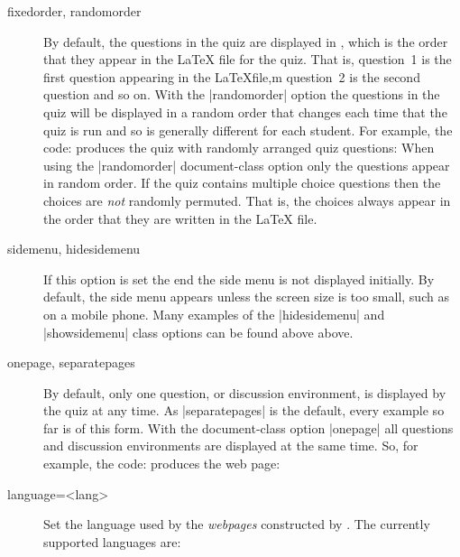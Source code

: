 \documentclass[svgnames]{article}
\begin{document}
\begin{description}
  \item[fixedorder, randomorder]
    By default, the questions in the quiz are displayed in
    , which is the order that they appear in
    the \LaTeX{} file for the quiz. That is, question~1 is the first
    question appearing in the \LaTeX file,m question~2 is the second
    question and so on. With the \LatexCode|randomorder| option the
    questions in the quiz will be displayed in a random order that
    changes each time that the quiz is run and so is generally different for
    each student. For example, the code:
    produces the quiz with randomly arranged quiz questions:
    When using the \LatexCode|randomorder| document-class option only
    the questions appear in random order. If the quiz contains multiple
    choice questions then the choices are \textit{not} randomly
    permuted. That is, the choices always appear in the order that they
    are written in the \LaTeX{} file.

  \item[sidemenu, hidesidemenu]
    If this option is set the end the side menu is not displayed
    initially. By default, the side menu appears unless the screen size
    is too small, such as on a mobile phone. Many examples of the
    \LatexCode|hidesidemenu| and \LatexCode|showsidemenu| class options
    can be found above above.

  \item[onepage, separatepages]
  By default, only one question, or discussion environment, is displayed
  by the quiz at any time. As \LatexCode|separatepages| is the default, every
  example so far is of this form. With the document-class option
  \LatexCode|onepage| all questions and discussion environments are
  displayed at the same time. So, for example, the code:
  produces the web page:

  \item[language=<lang>] 
  Set the language used by the \textit{webpages} constructed by \WebQuiz.
  The currently supported languages are:


\end{description}
\end{document}

